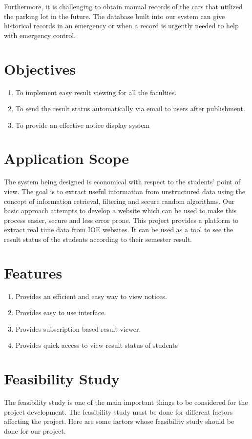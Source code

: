 Furthermore, it is challenging to obtain manual records of the cars that utilized the parking lot in the future. The database built into our system can give historical records in an emergency or when a record is urgently needed to help with emergency control.


\section{Objectives}
\begin{enumerate}[label=\Roman*]
\item To implement easy result viewing for all the faculties. 
\item  To send the result status automatically via email to users after publishment.
\item To provide an effective notice display system
\end{enumerate}
	

   

\section{Application Scope}
The system being designed is economical with respect to the students’ point of view. 
The goal is to extract useful information from unstructured data using the concept of 
information retrieval, filtering and secure random algorithms. Our basic approach 
attempts to develop a website which can be used to make this process easier, secure and 
less error prone. This project provides a platform to extract real time data from IOE 
websites. It can be used as a tool to see the result status of the students according to 
their semester result.


\section{Features}
\begin{enumerate}
	\item  Provides an efficient and easy way to view notices.
	\item  Provides easy to use interface.
	\item Provides subscription based result viewer.
	\item  Provides quick access to view result status of students
\end{enumerate}
\section{Feasibility Study}
The feasibility study is one of the main important things to be considered for the project 
development. The feasibility study must be done for different factors affecting the 
project. Here are some factors whose feasibility study should be done for our project.
